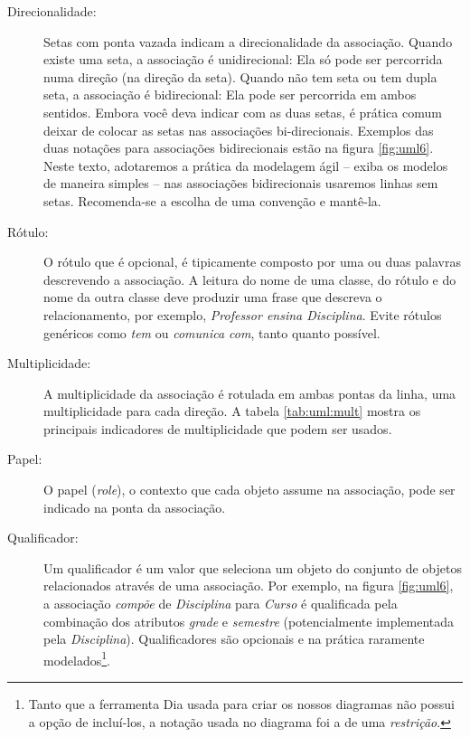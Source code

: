 \begin{description}
\item[Direcionalidade:] Setas com ponta vazada indicam a direcionalidade da associação. Quando existe uma seta, a associação é unidirecional: Ela só pode ser percorrida numa direção (na direção da seta). Quando não tem seta ou tem dupla seta, a associação é bidirecional: Ela pode ser percorrida em ambos sentidos. Embora você deva indicar com as duas setas, é prática comum deixar de colocar as setas nas associações bi-direcionais. Exemplos das duas notações para associações bidirecionais estão na figura \ref{fig:uml6}. Neste texto, adotaremos a prática da modelagem ágil -- exiba os modelos de maneira simples -- nas associações bidirecionais usaremos linhas sem setas. Recomenda-se a escolha de uma convenção e mantê-la.

\item[Rótulo:] O rótulo que é opcional, é tipicamente composto por uma ou duas palavras descrevendo a associação. A leitura do nome de uma classe, do rótulo e do nome da outra classe deve produzir uma frase que descreva o relacionamento, por exemplo, \emph{Professor ensina Disciplina}. Evite rótulos genéricos como \textit{tem} ou \textit{comunica com}, tanto quanto possível.

\item[Multiplicidade:] A multiplicidade da associação é rotulada em ambas pontas da linha, uma multiplicidade para cada direção. A tabela \ref{tab:uml:mult} mostra os principais indicadores de multiplicidade que podem ser usados.

\item[Papel:] O papel (\textit{role}), o contexto que cada objeto assume na associação, pode ser indicado na ponta da associação.

\item[Qualificador:] Um qualificador é um valor que seleciona um objeto do conjunto de objetos relacionados através de uma associação. Por exemplo, na figura \ref{fig:uml6}, a associação \emph{compõe} de \emph{Disciplina} para \emph{Curso} é qualificada pela combinação dos atributos \emph{grade} e \emph{semestre} (potencialmente implementada pela \emph{Disciplina}). Qualificadores são opcionais e na prática raramente modelados\footnote{Tanto que a ferramenta Dia usada para criar os nossos diagramas não possui a opção de incluí-los, a notação usada no diagrama foi a de uma \textit{restrição}.}.

\end{description}

